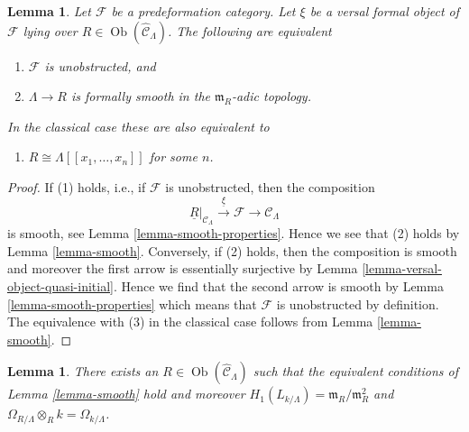 \documentclass{stacks-project}
\theoremstyle{plain}
\newtheorem{lemma}[subsection]{Lemma}
\theoremstyle{definition}
\theoremstyle{remark}
\numberwithin{equation}{subsection}
\def\Ob{\mathop{\mathrm{Ob}}\nolimits}
\begin{document}
\begin{lemma}
\label{lemma-smooth-power-series-classical}
Let $\mathcal{F}$ be a predeformation category.
Let $\xi$ be a versal formal object of $\mathcal{F}$ lying over
$R \in \Ob(\widehat{\mathcal{C}}_\Lambda)$. The following are
equivalent
\begin{enumerate}
\item $\mathcal{F}$ is unobstructed, and
\item $\Lambda \to R$ is formally smooth in the $\mathfrak m_R$-adic topology.
\end{enumerate}
In the classical case these are also equivalent to
\begin{enumerate}
\item[(3)] $R \cong \Lambda[[x_1, \ldots, x_n]]$ for some $n$.\
\end{enumerate}
\end{lemma}

\begin{proof}
If (1) holds, i.e., if $\mathcal{F}$ is unobstructed, then the composition
$$
\underline{R}|_{\mathcal{C}_\Lambda}
\xrightarrow{\underline{\xi}}
\mathcal{F}
\to
\mathcal{C}_\Lambda
$$
is smooth, see Lemma \ref{lemma-smooth-properties}.
Hence we see that (2) holds by Lemma \ref{lemma-smooth}.
Conversely, if (2) holds, then the composition is smooth
and moreover the first arrow is essentially surjective by
Lemma \ref{lemma-versal-object-quasi-initial}. Hence we
find that the second arrow is smooth by Lemma \ref{lemma-smooth-properties}
which means that $\mathcal{F}$ is unobstructed by definition.
The equivalence with (3) in the classical case follows
from Lemma \ref{lemma-smooth}.
\end{proof}

\begin{lemma}
\label{lemma-exists-smooth}
There exists an $R \in \Ob(\widehat{\mathcal{C}}_\Lambda)$
such that the equivalent conditions of Lemma \ref{lemma-smooth}
hold and moreover $H_1(L_{k/\Lambda}) = \mathfrak m_R/\mathfrak m_R^2$
and $\Omega_{R/\Lambda} \otimes_R k = \Omega_{k/\Lambda}$.
\end{lemma}
\end{document}
